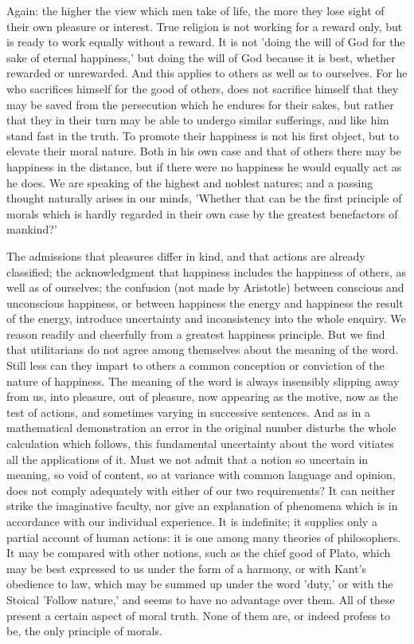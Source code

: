 \documentclass[11pt,letter]{article}
\begin{document}
\par  Again: the higher the view which men take of life, the more they lose sight of their own pleasure or interest. True religion is not working for a reward only, but is ready to work equally without a reward. It is not 'doing the will of God for the sake of eternal happiness,' but doing the will of God because it is best, whether rewarded or unrewarded. And this applies to others as well as to ourselves. For he who sacrifices himself for the good of others, does not sacrifice himself that they may be saved from the persecution which he endures for their sakes, but rather that they in their turn may be able to undergo similar sufferings, and like him stand fast in the truth. To promote their happiness is not his first object, but to elevate their moral nature. Both in his own case and that of others there may be happiness in the distance, but if there were no happiness he would equally act as he does. We are speaking of the highest and noblest natures; and a passing thought naturally arises in our minds, 'Whether that can be the first principle of morals which is hardly regarded in their own case by the greatest benefactors of mankind?'

\par  The admissions that pleasures differ in kind, and that actions are already classified; the acknowledgment that happiness includes the happiness of others, as well as of ourselves; the confusion (not made by Aristotle) between conscious and unconscious happiness, or between happiness the energy and happiness the result of the energy, introduce uncertainty and inconsistency into the whole enquiry. We reason readily and cheerfully from a greatest happiness principle. But we find that utilitarians do not agree among themselves about the meaning of the word. Still less can they impart to others a common conception or conviction of the nature of happiness. The meaning of the word is always insensibly slipping away from us, into pleasure, out of pleasure, now appearing as the motive, now as the test of actions, and sometimes varying in successive sentences. And as in a mathematical demonstration an error in the original number disturbs the whole calculation which follows, this fundamental uncertainty about the word vitiates all the applications of it. Must we not admit that a notion so uncertain in meaning, so void of content, so at variance with common language and opinion, does not comply adequately with either of our two requirements? It can neither strike the imaginative faculty, nor give an explanation of phenomena which is in accordance with our individual experience. It is indefinite; it supplies only a partial account of human actions: it is one among many theories of philosophers. It may be compared with other notions, such as the chief good of Plato, which may be best expressed to us under the form of a harmony, or with Kant's obedience to law, which may be summed up under the word 'duty,' or with the Stoical 'Follow nature,' and seems to have no advantage over them. All of these present a certain aspect of moral truth. None of them are, or indeed profess to be, the only principle of morals.
\end{document}
